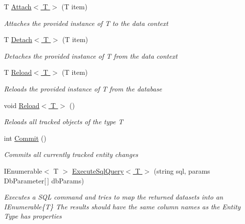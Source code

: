 \begin{DoxyCompactItemize}
T \hyperlink{class_highway_1_1_data_1_1_entity_framework_1_1_contexts_1_1_entity_framework_context_ae482a535469bb401c655d1581a4f34a6}{Attach$<$ T $>$} (T item)
\begin{DoxyCompactList}\small\item\em Attaches the provided instance of {\itshape T}  to the data context \end{DoxyCompactList}\item 
T \hyperlink{class_highway_1_1_data_1_1_entity_framework_1_1_contexts_1_1_entity_framework_context_aa0ccdc09ac449783a450a6098946a289}{Detach$<$ T $>$} (T item)
\begin{DoxyCompactList}\small\item\em Detaches the provided instance of {\itshape T}  from the data context \end{DoxyCompactList}\item 
T \hyperlink{class_highway_1_1_data_1_1_entity_framework_1_1_contexts_1_1_entity_framework_context_a5a2499b1327d56166ff950578d62d615}{Reload$<$ T $>$} (T item)
\begin{DoxyCompactList}\small\item\em Reloads the provided instance of {\itshape T}  from the database \end{DoxyCompactList}\item 
void \hyperlink{class_highway_1_1_data_1_1_entity_framework_1_1_contexts_1_1_entity_framework_context_afb94c4b4111081a2b1100591f5298db1}{Reload$<$ T $>$} ()
\begin{DoxyCompactList}\small\item\em Reloads all tracked objects of the type {\itshape T}  \end{DoxyCompactList}\item 
int \hyperlink{class_highway_1_1_data_1_1_entity_framework_1_1_contexts_1_1_entity_framework_context_a9a423f1dabec6bc46f393965c815237d}{Commit} ()
\begin{DoxyCompactList}\small\item\em Commits all currently tracked entity changes \end{DoxyCompactList}\item 
I\-Enumerable$<$ T $>$ \hyperlink{class_highway_1_1_data_1_1_entity_framework_1_1_contexts_1_1_entity_framework_context_a0a1fde31dabdc1a0e2cdef5dbfdefa2f}{Execute\-Sql\-Query$<$ T $>$} (string sql, params Db\-Parameter\mbox{[}$\,$\mbox{]} db\-Params)
\begin{DoxyCompactList}\small\item\em Executes a S\-Q\-L command and tries to map the returned datasets into an I\-Enumerable\{\-T\} The results should have the same column names as the Entity Type has properties \end{DoxyCompactList}\item 

\end{DoxyCompactItemize}
